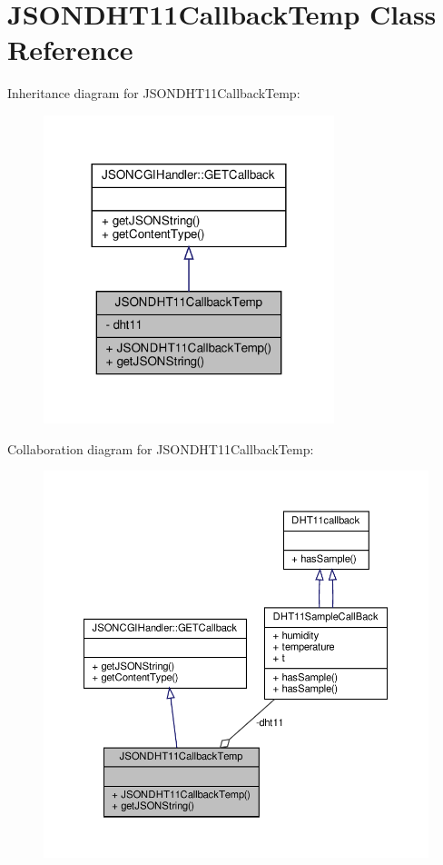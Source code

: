 \hypertarget{classJSONDHT11CallbackTemp}{}\section{J\+S\+O\+N\+D\+H\+T11\+Callback\+Temp Class Reference}
\label{classJSONDHT11CallbackTemp}


Inheritance diagram for J\+S\+O\+N\+D\+H\+T11\+Callback\+Temp\+:
\nopagebreak
\begin{figure}[H]
\begin{center}
\leavevmode
\includegraphics[width=240pt]{classJSONDHT11CallbackTemp__inherit__graph}
\end{center}
\end{figure}


Collaboration diagram for J\+S\+O\+N\+D\+H\+T11\+Callback\+Temp\+:
\nopagebreak
\begin{figure}[H]
\begin{center}
\leavevmode
\includegraphics[width=350pt]{classJSONDHT11CallbackTemp__coll__graph}
\end{center}
\end{figure}
